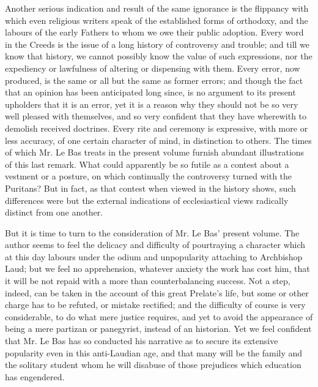 Another serious indication and result of the same
ignorance is the flippancy with which even religious writers speak of
the established forms of orthodoxy, and the labours of the early Fathers
to whom we owe their public adoption. Every word in the Creeds is the
issue of a long history of controversy and trouble; and till we know
that history, we cannot possibly know the value of such expressions, nor
the expediency or lawfulness of altering or dispensing with them. Every
error, now produced, is the same or all but the same as former errors;
and though the fact that an opinion has been anticipated long since, is
no argument to its present upholders that it is an error, yet it is a
reason why they should not be so very well pleased with
themselves, and so very confident that they have wherewith to demolish
received doctrines. Every rite and ceremony is expressive, with more or
less accuracy, of one certain character of mind, in distinction to
others. The times of which Mr. Le Bas treats in the present volume
furnish abundant illustrations of this last remark. What could
apparently be so futile as a contest about a vestment or a posture, on
which continually the controversy turned with the Puritans? But in fact,
as that contest when viewed in the history shows, such differences were
but the external indications of ecclesiastical views radically distinct
from one another.

But it is time to turn to the consideration of Mr.
Le Bas' present volume. The author seems to feel the delicacy and
difficulty of pourtraying a character which at this day labours under
the odium and unpopularity attaching to Archbishop Laud; but we feel no
apprehension, whatever anxiety the work has cost him, that it will be
not repaid with a more than counterbalancing success. Not a step,
indeed, can be taken in the account of this great Prelate's life, but
some or other charge has to be refuted, or mistake rectified; and the
difficulty of course is very considerable, to do what mere justice
requires, and yet to avoid the appearance of being a mere partizan or
panegyrist, instead of an historian. Yet we feel confident that Mr. Le
Bas has so conducted his narrative as to secure its extensive popularity
even in this anti-Laudian age, and that many will be the family and the
solitary student whom he will disabuse of those prejudices which
education has engendered.


